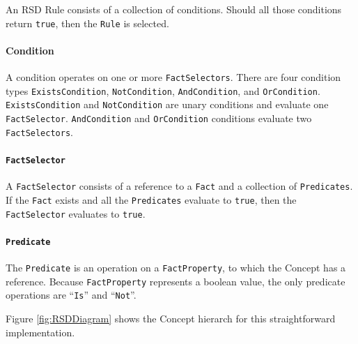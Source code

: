 An RSD Rule consists of a collection of conditions.
Should all those conditions return \texttt{true}, then the \texttt{Rule} is selected.

\paragraph{Condition} A condition operates on one or more \texttt{FactSelectors}.
There are four condition types \texttt{ExistsCondition}, \texttt{NotCondition}, \texttt{AndCondition}, and \texttt{OrCondition}.
\texttt{ExistsCondition} and \texttt{NotCondition} are unary conditions and evaluate one \texttt{FactSelector}.
\texttt{AndCondition} and \texttt{OrCondition} conditions evaluate two \texttt{FactSelectors}.

\paragraph{\texttt{FactSelector}} A \texttt{FactSelector} consists of a reference to a \texttt{Fact} and a collection of \texttt{Predicates}.
If the \texttt{Fact} exists and all the \texttt{Predicates} evaluate to \texttt{true}, then the \texttt{FactSelector} evaluates to \texttt{true}.

\paragraph{\texttt{Predicate}} The \texttt{Predicate} is an operation on a \texttt{FactProperty}, to which the Concept has a reference.
Because \texttt{FactProperty} represents a boolean value, the only predicate operations are ``\texttt{Is}'' and ``\texttt{Not}''.

Figure \ref{fig:RSDDiagram} shows the Concept hierarch for this straightforward implementation.

